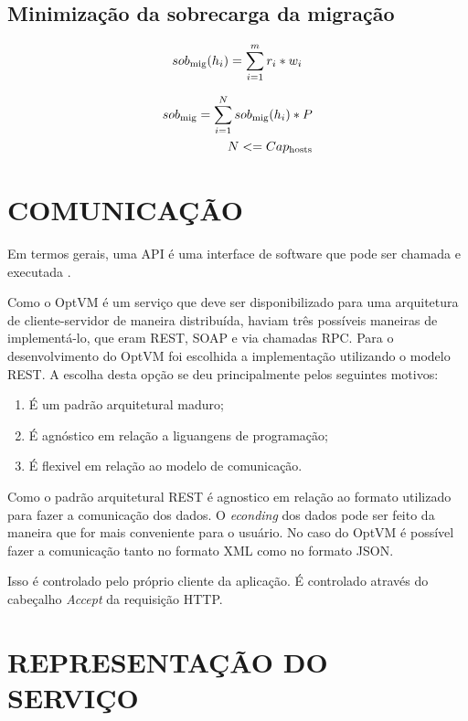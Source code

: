 \subsection{Minimização da sobrecarga da migração}

\begin{equation}
sob\textsubscript{mig}(h_i) = \sum_{i=1}^{m}r_i * w_i
\label{eq:sobHi}
\end{equation}


\begin{equation}
\begin{split}
sob\textsubscript{mig} = \sum_{i=1}^{N}sob\textsubscript{mig}(h_i) * P  \\
N <= Cap\textsubscript{hosts}
\end{split}
\label{eq:sobrecarga}
\end{equation}

\section{COMUNICAÇÃO}
Em termos gerais, uma API é uma interface de software que pode ser chamada e executada \cite{eizinger}. 

Como o OptVM é um serviço que deve ser disponibilizado para uma arquitetura de 
cliente-servidor de maneira distribuída, haviam três possíveis maneiras de implementá-lo, 
que eram REST, SOAP e via chamadas RPC. 
Para o desenvolvimento do OptVM foi escolhida a implementação utilizando o modelo REST. 
A escolha desta opção se deu principalmente pelos seguintes motivos:

\begin{enumerate}
\item É um padrão arquitetural maduro;
\item É agnóstico em relação a liguangens de programação;
\item É flexivel em relação ao modelo de comunicação.
\end{enumerate}

Como o padrão arquitetural REST é agnostico em relação ao formato utilizado para fazer a comunicação dos dados. O \textit{econding} 
dos dados pode ser feito da maneira que for mais conveniente para o usuário. No caso do OptVM é possível fazer a comunicação
tanto no formato XML como no formato JSON.

Isso é controlado pelo próprio cliente da aplicação. É controlado através do cabeçalho \textit{Accept}
da requisição HTTP.

\section{REPRESENTAÇÃO DO SERVIÇO}


